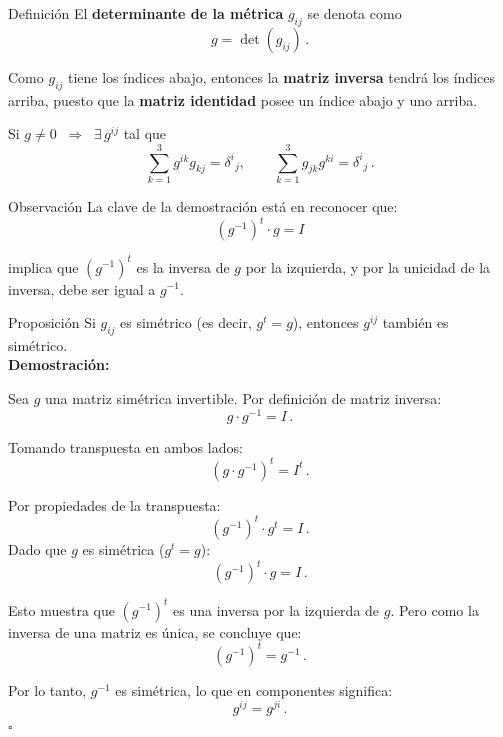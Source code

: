 \documentclass[../apunte_mecanica_clasica.tex]{subfiles}%
\begin{document}
\begin{apuntebloque}{Definición}
El \textbf{determinante de la métrica} $g_{ij}$ se denota como
\begin{equation*}
    g = \det(g_{ij}) \,.
\end{equation*}
\end{apuntebloque}

Como $g_{ij}$ tiene los índices abajo, entonces la \textbf{matriz inversa} 
tendrá los índices arriba, puesto que la \textbf{matriz identidad} posee 
un índice abajo y uno arriba.

Si $g \neq 0 \;\;\Rightarrow\;\; \exists\, g^{ij}$ tal que
\begin{equation*}
    \sum_{k=1}^3 g^{ik} g_{kj} = \delta^i{}_j,
    \qquad
    \sum_{k=1}^3 g_{jk} g^{ki} = \delta^i{}_j \,.
\end{equation*}


\begin{apuntebloque}{Observación}
La clave de la demostración está en reconocer que:
\begin{equation*}
    (g^{-1})^t \cdot g = I
\end{equation*}

implica que $(g^{-1})^t$ es la inversa de $g$ por la izquierda, y por la unicidad de la inversa, debe ser igual a $g^{-1}$.
\end{apuntebloque}


\begin{apuntebloque}{Proposición}
Si $g_{ij}$ es simétrico (es decir, $g^t = g$), entonces $g^{ij}$ también es simétrico.\\

\textbf{Demostración:}

Sea $g$ una matriz simétrica invertible. Por definición de matriz inversa:
\begin{equation*}
    g \cdot g^{-1} = I \,.
\end{equation*}

Tomando transpuesta en ambos lados:
\begin{equation*}
(g \cdot g^{-1})^t = I^t \,.
\end{equation*}

Por propiedades de la transpuesta:
\begin{equation*}
(g^{-1})^t \cdot g^t = I \,.
\end{equation*}
Dado que $g$ es simétrica ($g^t = g$):
\begin{equation*}
(g^{-1})^t \cdot g = I \,.
\end{equation*}

Esto muestra que $(g^{-1})^t$ es una inversa por la izquierda de $g$. Pero como la inversa de una matriz es única, se concluye que:
\begin{equation*}
(g^{-1})^t = g^{-1} \,.
\end{equation*}

Por lo tanto, $g^{-1}$ es simétrica, lo que en componentes significa:
\begin{equation*}
g^{ij} = g^{ji} \,.
\end{equation*}
\hfill $\square$
\end{apuntebloque}
\end{document}
